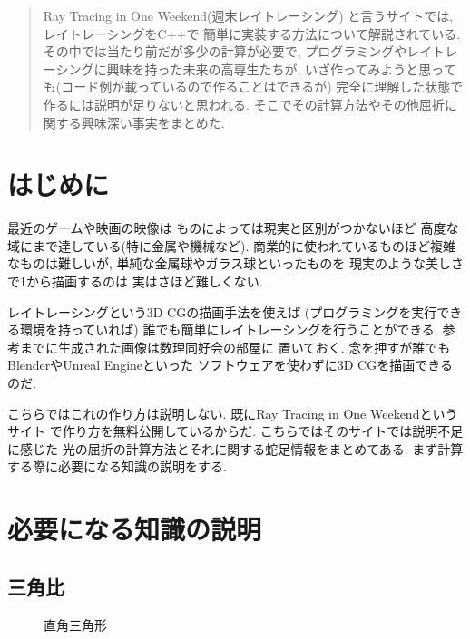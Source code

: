 \documentclass[a4paper, xelatex, ja=standard]{bxjsarticle}
\begin{document}
\maketitle
\begin{abstract}
Ray Tracing in One Weekend(週末レイトレーシング)
と言うサイトでは,
レイトレーシングをC++で
簡単に実装する方法について解説されている.
その中では当たり前だが多少の計算が必要で,
プログラミングやレイトレーシングに興味を持った未来の高専生たちが,
いざ作ってみようと思っても(コード例が載っているので作ることはできるが)
完全に理解した状態で作るには説明が足りないと思われる.
そこでその計算方法やその他屈折に関する興味深い事実をまとめた.
\end{abstract}

\section{はじめに}
最近のゲームや映画の映像は
ものによっては現実と区別がつかないほど
高度な域にまで達している(特に金属や機械など).
商業的に使われているものほど複雑なものは難しいが,
単純な金属球やガラス球といったものを
現実のような美しさで1から描画するのは
実はさほど難しくない.

レイトレーシングという3D CGの描画手法を使えば
(プログラミングを実行できる環境を持っていれば)
誰でも簡単にレイトレーシングを行うことができる.
参考までに生成された画像は数理同好会の部屋に
置いておく.
念を押すが誰でもBlenderやUnreal Engineといった
ソフトウェアを使わずに3D CGを描画できるのだ.

こちらではこれの作り方は説明しない.
既にRay Tracing in One Weekendというサイト
で作り方を無料公開しているからだ.
こちらではそのサイトでは説明不足に感じた
光の屈折の計算方法とそれに関する蛇足情報をまとめてある.
まず計算する際に必要になる知識の説明をする.

\section{必要になる知識の説明}
\subsection*{三角比}
\begin{figure}[h]
\centering
{}
\caption{直角三角形}
\label{fig:sin-triangle}
\end{figure}
\end{document}

